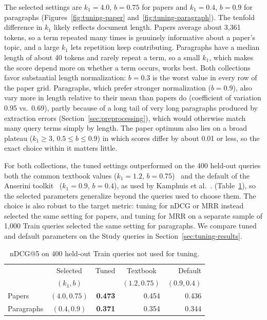 \documentclass[sigconf,nonacm]{acmart}
\begin{document}
The selected settings are $k_1 = 4.0$, $b = 0.75$ for papers and $k_1 = 0.4$, $b = 0.9$ 
for paragraphs (Figures~\ref{fig:tuning-paper} and~\ref{fig:tuning-paragraph}). The tenfold 
difference in $k_1$ likely reflects document length. Papers average about 3,361 tokens, so a term 
repeated many times is genuinely informative about a paper's topic, and a large $k_1$ lets 
repetition keep contributing. Paragraphs have a median length of about 40 tokens and rarely repeat a term, 
so a small $k_1$, which makes the score depend more on whether a term occurs, works best. 
Both collections favor substantial length normalization: $b = 0.3$ is the worst value in 
every row of the paper grid. Paragraphs, which prefer stronger normalization ($b = 0.9$), also vary
more in length relative to their mean than papers do (coefficient of variation 0.95 vs.\ 0.69), 
partly because of a long tail of very long paragraphs produced by extraction errors 
(Section~\ref{sec:preprocessing}), which would otherwise match many query terms simply by 
length. The paper optimum also lies on a broad plateau ($k_1 \geq 3$, $0.5 \leq b \leq 0.9$) in 
which scores differ by about 0.01 or less, so the exact choice within it matters little.

For both collections, the tuned settings outperformed on the 400 held-out queries both the common textbook values
($k_1 = 1.2$, $b = 0.75$)~\cite[Sec.~11.4.3]{manning2008irbook} and the default of the Anserini toolkit~\cite{yang2017anserini}
($k_1 = 0.9$, $b = 0.4$), as used by Kamphuis et al.~\cite{kamphuis2020bm25}. 
(Table~\ref{tab:heldout}), so the selected 
parameters generalize beyond the queries used to choose them. The choice is also robust to 
the target metric: tuning for nDCG or MRR instead selected the same setting for papers, and 
tuning for MRR on a separate sample of 1,000 Train queries selected the same setting for 
paragraphs. We compare tuned and default parameters on the Study queries in Section~\ref{sec:tuning-results}.

\begin{table}[t]
  \caption{nDCG@5 on 400 held-out Train queries not used for tuning.}
  \label{tab:heldout}
  \small
  \begin{tabular}{lcrrr}
    \toprule
    & Selected & Tuned & Textbook~\cite{manning2008irbook} & Default \\
    & $(k_1, b)$ & & $(1.2, 0.75)$ & $(0.9, 0.4)$ \\
    \midrule
    Papers     & $(4.0, 0.75)$ & \textbf{0.473} & 0.454 & 0.436 \\
    Paragraphs & $(0.4, 0.9)$  & \textbf{0.371} & 0.354 & 0.344 \\
    \bottomrule
  \end{tabular}
\end{table}
\end{document}
